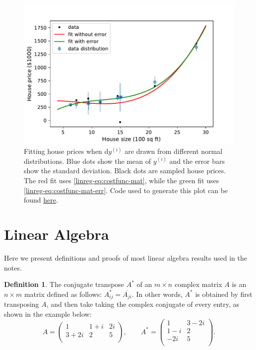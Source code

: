 \documentclass{article}
\theoremstyle{definition}
\newtheorem{definition}{Definition}[section]
\begin{document}
\begin{figure}[ht]
\centering
\includegraphics[scale=0.7]{images/lin_reg/yerror.pdf}
\caption{Fitting house prices when d$y^{(i)}$ are drawn from different normal distributions. Blue dots show the mean of $y^{(i)}$ and the error bars show the standard deviation. Black dots are sampled house prices. The red fit uses \eqref{linreg-eq:costfunc-mat}, while the green fit uses \eqref{linreg-eq:costfunc-mat-err}. Code used to generate this plot can be found \href{https://github.com/siavashaslanbeigi/ml_notes_supp/blob/master/lin_reg/yerror.ipynb}{\color{blue} here}.}
\label{linreg-fig:yerror}
\end{figure}


\newpage
\appendix
\section{Linear Algebra}
Here we present definitions and proofs of most linear algebra results used in the notes.
\begin{definition}
The conjugate transpose $A^*$ of an $m\times n$ complex matrix $A$ is an $n \times m$ matrix defined as follows: $A^*_{ij}=\overline{A_{ji}}$. In other words, $A^*$ is obtained by first transposing $A$, and then take taking the complex conjugate of every entry, as shown in the example below:
\begin{equation}
    A =
    \begin{pmatrix}
        1 & 1+i & 2i \\
        3+2i & 2 & 5 \\
    \end{pmatrix},
    \qquad
    A^* =
    \begin{pmatrix}
        1 & 3-2i \\
        1-i & 2 \\
        -2i & 5 \\
    \end{pmatrix}.
\end{equation}
\end{definition}
\end{document}
